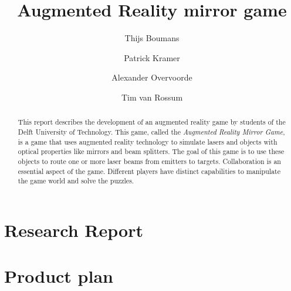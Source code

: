 \documentclass[]{report}
\title{Augmented Reality mirror game}
\author{Thijs Boumans \and Patrick Kramer \and
        Alexander Overvoorde \and Tim van Rossum}
\begin{document}
\maketitle

\begin{abstract}
This report describes the development of an augmented reality game
by students of the Delft University of Technology. This game, called the \emph{Augmented Reality Mirror Game},
is a game that uses augmented reality technology to simulate lasers and objects with optical properties like mirrors and beam splitters. The goal of this game is to use these objects to route one or more laser beams from emitters to targets. Collaboration is an essential aspect of the game. Different players have distinct capabilities to manipulate the game world and solve the puzzles.
\end{abstract}
\tableofcontents
\listoffigures







\appendix

\chapter{Research Report} \label{app:researchreport}





\chapter{Product plan} \label{app:productplan}







\pagebreak
{}

\end{document}
